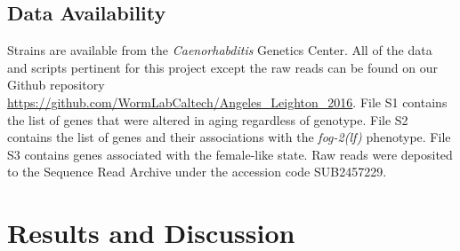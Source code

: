 \documentclass[9pt,twocolumn,twoside]{gsag3jnl}
\newcommand{\fog}{\emph{\mbox{fog-2(lf)}}}
\begin{document}
\subsection*{Data Availability}
\label{sb:data_availability}
Strains are available from the \emph{Caenorhabditis} Genetics Center. All of the
data and scripts pertinent for this project except the raw reads can be found on
our Github repository
\url{https://github.com/WormLabCaltech/Angeles_Leighton_2016}. File S1 contains
the list of genes that were altered in aging regardless of genotype. File S2
contains the list of genes and their associations with the \fog{} phenotype.
File S3 contains genes associated with the female-like state. Raw reads were
deposited to the Sequence Read Archive under the accession code SUB2457229.

\section{Results and Discussion}
\end{document}
